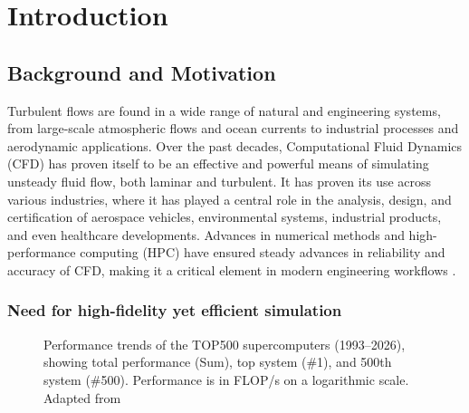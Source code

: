 \chapter{Introduction}
\label{chap: Introduction}


\section{Background and Motivation}
Turbulent flows are found in a wide range of natural and engineering systems, from large-scale atmospheric flows and ocean currents to industrial processes and aerodynamic applications. Over the past decades, Computational Fluid Dynamics (CFD) has proven itself to be an effective and powerful means of simulating unsteady fluid flow, both laminar and turbulent. It has proven its use across various industries, where it has played a central role in the analysis, design, and certification of aerospace vehicles, environmental systems, industrial products, and even healthcare developments. Advances in numerical methods and high-performance computing (HPC) have ensured steady advances in reliability and accuracy of CFD, making it a critical element in modern engineering workflows \cite{Spalart2016}. 

\subsection{Need for high-fidelity yet efficient simulation}


\begin{figure}
    \centering
    
    \caption{Performance trends of the TOP500 supercomputers (1993–2026), showing total performance (Sum), top system ($\#$1), and 500th system ($\#$500). Performance is in FLOP/s on a logarithmic scale. Adapted from \textcite{top500}}
    \label{fig: Moore}
\end{figure}


